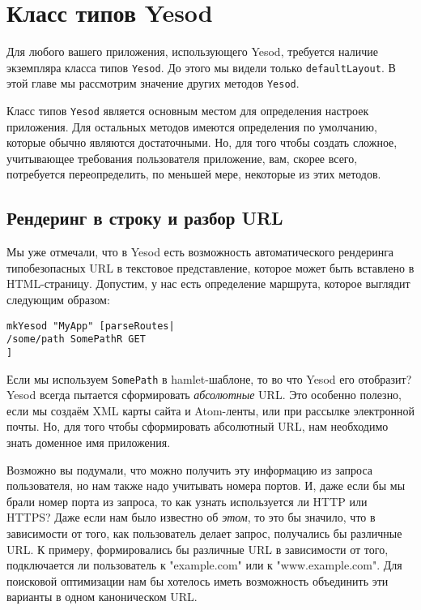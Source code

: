 \chapter {Класс типов Yesod}\label{chap:yesod-typeclass}

Для любого вашего приложения, использующего Yesod, требуется наличие экземпляра класса типов \lstinline!Yesod!. До этого мы видели только \lstinline!defaultLayout!. В этой главе мы рассмотрим значение других методов \lstinline!Yesod!.

Класс типов \lstinline!Yesod! является основным местом для определения настроек приложения. Для остальных методов имеются определения по умолчанию, которые обычно являются достаточными. Но, для того чтобы создать сложное, учитывающее требования пользователя приложение, вам, скорее всего, потребуется переопределить, по меньшей мере, некоторые из этих методов.

\section {Рендеринг в строку и разбор URL}

Мы уже отмечали, что в Yesod есть возможность автоматического рендеринга типобезопасных URL в текстовое представление, которое может быть вставлено в HTML-страницу. Допустим, у нас есть определение маршрута, которое выглядит следующим образом:

\begin{lstlisting}
mkYesod "MyApp" [parseRoutes|
/some/path SomePathR GET
]
\end{lstlisting}

Если мы используем \lstinline!SomePath! в hamlet-шаблоне, то во что Yesod его отобразит? Yesod всегда пытается сформировать \emph{абсолютные} URL. Это особенно полезно, если мы создаём XML карты сайта и Atom-ленты, или при рассылке электронной почты. Но, для того чтобы сформировать абсолютный URL, нам необходимо знать доменное имя приложения.

Возможно вы подумали, что можно получить эту информацию из запроса пользователя, но нам также надо учитывать номера портов. И, даже если бы мы брали номер порта из запроса, то как узнать используется ли HTTP или HTTPS? Даже если нам было известно об \emph{этом}, то это бы значило, что в зависимости от того, как пользователь делает запрос, получались бы различные URL. К примеру, формировались бы различные URL в зависимости от того, подключается ли пользователь к "example.com" или к "www.example.com". Для поисковой оптимизации нам бы хотелось иметь возможность объединить эти варианты в одном каноническом URL.

